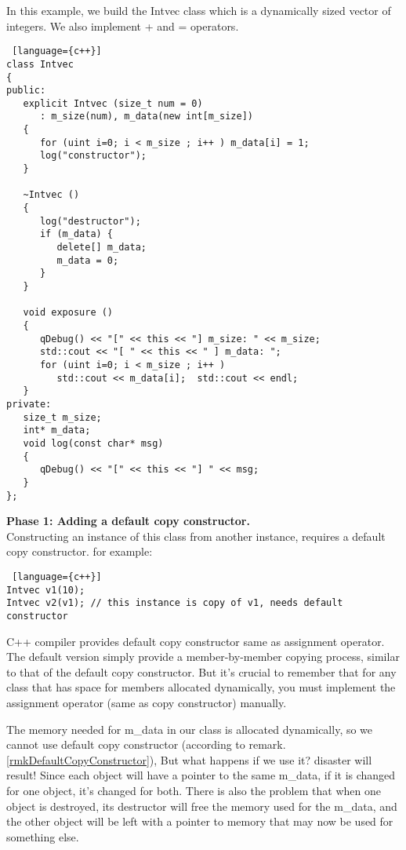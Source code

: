\begin{note}

In this example, we build the Intvec class which is a dynamically sized vector of integers. We also implement + and = operators.
\begin{lstlisting} [language={c++}]
class Intvec
{
public:
   explicit Intvec (size_t num = 0)
      : m_size(num), m_data(new int[m_size])
   {
      for (uint i=0; i < m_size ; i++ ) m_data[i] = 1;
      log("constructor");
   }

   ~Intvec ()
   {
      log("destructor");
      if (m_data) {
         delete[] m_data;
         m_data = 0;
      }
   }
   
   void exposure ()
   {
      qDebug() << "[" << this << "] m_size: " << m_size;
      std::cout << "[ " << this << " ] m_data: ";
      for (uint i=0; i < m_size ; i++ )
         std::cout << m_data[i];  std::cout << endl;
   }
private:
   size_t m_size;
   int* m_data;
   void log(const char* msg)
   {
      qDebug() << "[" << this << "] " << msg;
   }
};
\end{lstlisting}
\textbf{Phase 1: Adding a default copy constructor.}\\
Constructing an instance of this class from another instance, requires a default copy constructor. for example:
\begin{lstlisting} [language={c++}]
Intvec v1(10);
Intvec v2(v1); // this instance is copy of v1, needs default constructor
\end{lstlisting}
\begin{remark} \label{rmkDefaultCopyConstructor}
	C++ compiler provides default copy constructor same as assignment operator. The default version simply provide a member-by-member copying process, similar to that of the default copy constructor. But it's crucial to remember that for any class that has
	space for members allocated dynamically, you must implement the assignment operator (same as copy constructor) manually.
\end{remark}
The memory needed for m\_data in our class is allocated dynamically, so we cannot use default copy constructor (according to remark.\ref{rmkDefaultCopyConstructor}), But what happens if we use it? disaster will result! Since each object will have a pointer to the same
m\_data, if it is changed for one object, it’s changed for both. There is also the problem that when one object is destroyed, its destructor will free the memory used for the m\_data, and the other object will be left with a pointer to memory that may now be used for something else.

\end{note}
